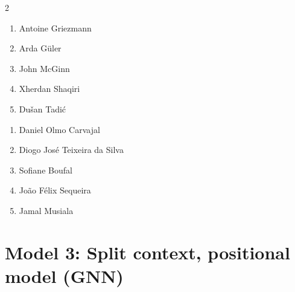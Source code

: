 \documentclass[11pt]{article}
\begin{document}
\begin{multicols}{2}
\begin{samepage}
\begin{tcolorbox}[evalbox,title=\textbf{Lionel Messi (Right Center Forward)} \hfill Score:\ \rule{1cm}{0.4pt}]
\begin{enumerate}
\item Antoine Griezmann
\item Arda Güler
\item John McGinn
\item Xherdan Shaqiri
\item Dušan Tadić
\end{enumerate}
\end{tcolorbox}
\end{samepage}

\begin{samepage}
\begin{tcolorbox}[evalbox,title=\textbf{Kylian Mbappé (Left Wing)} \hfill Score:\ \rule{1cm}{0.4pt}]
\begin{enumerate}
\item Daniel Olmo Carvajal
\item Diogo José Teixeira da Silva
\item Sofiane Boufal
\item João Félix Sequeira
\item Jamal Musiala
\end{enumerate}
\end{tcolorbox}
\end{samepage}

\end{multicols}

\section*{Model 3: Split context, positional model (GNN)}
\end{document}
